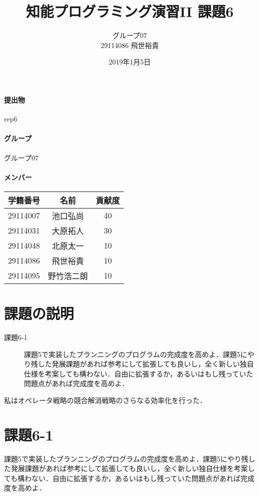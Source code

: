 \documentclass[a4j]{jarticle}
\title{知能プログラミング演習II 課題6}
\author{グループ07\\
  29114086 飛世裕貴\\
}
\date{2019年1月5日}
\begin{document}
\maketitle

\paragraph{提出物} rep6
\paragraph{グループ} グループ07
\paragraph{メンバー}
\begin{tabular}{|c|c|c|}
  \hline\hline
  学籍番号&名前&貢献度\\
  \hline\hline
  29114007&池口弘尚&40\\
  \hline
  29114031&大原拓人&30\\
  \hline
  29114048&北原太一&10\\
  \hline
  29114086&飛世裕貴&10\\
  \hline
  29114095&野竹浩二朗&10\\
  \hline
\end{tabular}



\section{課題の説明}
\begin{description}
\item[課題6-1] 課題5で実装したプランニングのプログラムの完成度を高めよ．課題5にやり残した発展課題があれば参考にして拡張しても良いし，全く新しい独自仕様を考案しても構わない．自由に拡張するか，あるいはもし残っていた問題点があれば完成度を高めよ．

\end{description}
私はオペレータ戦略の競合解消戦略のさらなる効率化を行った．
\section{課題6-1}
\begin{screen}
課題5で実装したプランニングのプログラムの完成度を高めよ．課題5にやり残した発展課題があれば参考にして拡張しても良いし，全く新しい独自仕様を考案しても構わない．自由に拡張するか，あるいはもし残っていた問題点があれば完成度を高めよ．
\end{screen}
\end{document}
